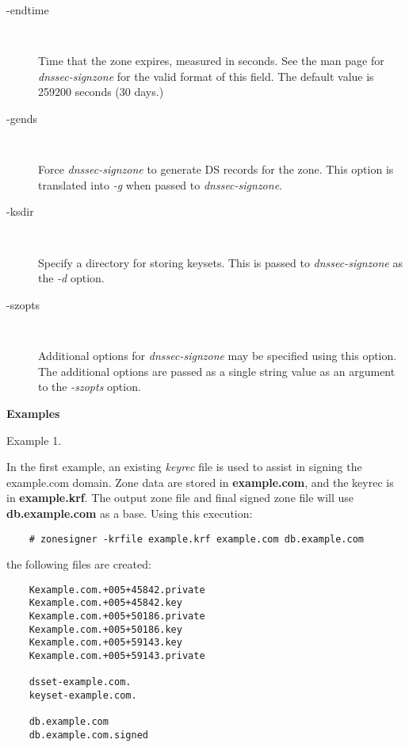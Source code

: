 \begin{description}

\item [-endtime]\verb" "

Time that the zone expires, measured in seconds.  See the man page for
{\it dnssec-signzone} for the valid format of this field.
The default value is 259200 seconds (30 days.)

\item [-gends]\verb" "

Force {\it dnssec-signzone} to generate DS records for the zone.  This option is
translated into {\it -g} when passed to {\it dnssec-signzone}.

\item [-ksdir]\verb" "

Specify a directory for storing keysets.  This is passed to {\it
dnssec-signzone} as the {\it -d} option.

\item [-szopts]\verb" "

Additional options for {\it dnssec-signzone} may be specified using this option.
The additional options are passed as a single string value as an argument to
the {\it -szopts} option.

\end{description}

{\bf Examples}

Example 1.

In the first example, an existing {\it keyrec} file is used to assist in
signing the example.com domain.  Zone data are stored in {\bf example.com},
and the keyrec is in {\bf example.krf}.  The output zone file and final signed
zone file will use {\bf db.example.com} as a base.  Using this execution:

\begin{verbatim}    # zonesigner -krfile example.krf example.com db.example.com\end{verbatim}

the following files are created:

\begin{verbatim}
    Kexample.com.+005+45842.private
    Kexample.com.+005+45842.key
    Kexample.com.+005+50186.private
    Kexample.com.+005+50186.key
    Kexample.com.+005+59143.key
    Kexample.com.+005+59143.private

    dsset-example.com.
    keyset-example.com.

    db.example.com
    db.example.com.signed
\end{verbatim}


